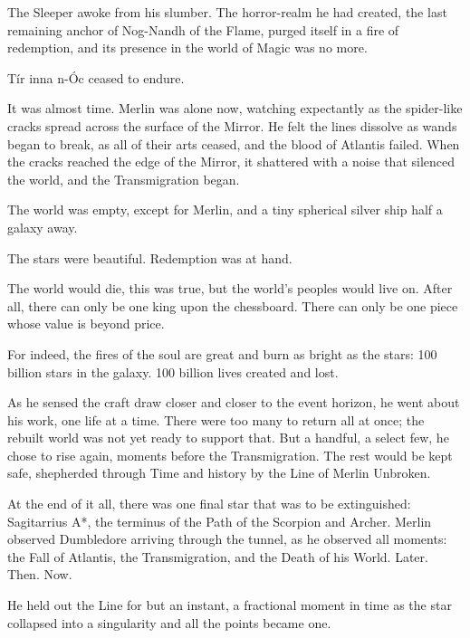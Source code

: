 The Sleeper awoke from his slumber. The horror-realm he had created, the last remaining anchor of Nog-Nandh of the Flame, purged itself in a fire of redemption, and its presence in the world of Magic was no more.

Tír inna n-Óc ceased to endure.
\simpleline

It was almost time. Merlin was alone now, watching expectantly as the spider-like cracks spread across the surface of the Mirror. He felt the lines dissolve as wands began to break, as all of their arts ceased, and the blood of Atlantis failed. When the cracks reached the edge of the Mirror, it shattered with a noise that silenced the world, and the Transmigration began.
\simpleline


The world was empty, except for Merlin, and a tiny spherical silver ship half a galaxy away.

The stars were beautiful. Redemption was at hand.

The world would die, this was true, but the world’s peoples would live on. After all, there can only be one king upon the chessboard. There can only be one piece whose value is beyond price.

For indeed, the fires of the soul are great and burn as bright as the stars: 100 billion stars in the galaxy. 100 billion lives created and lost.

As he sensed the craft draw closer and closer to the event horizon, he went about his work, one life at a time. There were too many to return all at once; the rebuilt world was not yet ready to support that. But a handful, a select few, he chose to rise again, moments before the Transmigration. The rest would be kept safe, shepherded through Time and history by the Line of Merlin Unbroken.

At the end of it all, there was one final star that was to be extinguished: Sagitarrius A*, the terminus of the Path of the Scorpion and Archer. Merlin observed Dumbledore arriving through the tunnel, as he observed all moments: the Fall of Atlantis, the Transmigration, and the Death of his World. Later. Then. Now.

He held out the Line for but an instant, a fractional moment in time as the star collapsed into a singularity and all the points became one.
\simpleline

